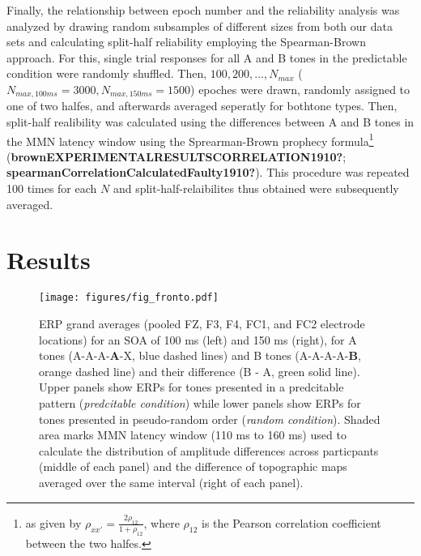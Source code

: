 \documentclass[stu,a4paper,12pt, nofontenc, babel, american]{apa7}
\begin{document}
Finally, the relationship between epoch number and the reliability
analysis was analyzed by drawing random subsamples of different sizes
from both our data sets and calculating split-half reliability employing
the Spearman-Brown approach. For this, single trial responses for all A
and B tones in the predictable condition were randomly shuffled. Then,
\(100, 200, ..., N_{max}\)
(\(N_{max, 100ms} = 3000, N_{max, 150ms}=1500\)) epoches were drawn,
randomly assigned to one of two halfes, and afterwards averaged
seperatly for bothtone types. Then, split-half realibility was
calculated using the differences between A and B tones in the MMN
latency window using the Sprearman-Brown prophecy formula\footnote{as
  given by \({\rho}_{xx'} = \frac{2{\rho}_{12}}{1+{\rho}_{12}}\), where
  \({\rho_{12}}\) is the Pearson correlation coefficient between the two
  halfes.} (\textbf{brownEXPERIMENTALRESULTSCORRELATION1910?};
\textbf{spearmanCorrelationCalculatedFaulty1910?}). This procedure was
repeated 100 times for each \(N\) and split-half-relaibilites thus
obtained were subsequently averaged.

\newpage

\hypertarget{results}{%
\section{Results}\label{results}}

\begin{figure}
\hypertarget{fig:fronto}{%
\centering
\texttt{[image: figures/fig\_fronto.pdf]}
\caption{ERP grand averages (pooled FZ, F3, F4, FC1, and FC2 electrode
locations) for an SOA of 100 ms (left) and 150 ms (right), for A tones
(A-A-A-\textbf{A}-X, blue dashed lines) and B tones (A-A-A-A-\textbf{B},
orange dashed line) and their difference (B - A, green solid line).
Upper panels show ERPs for tones presented in a predcitable pattern
(\emph{predcitable condition}) while lower panels show ERPs for tones
presented in pseudo-random order (\emph{random condition}). Shaded area
marks MMN latency window (110 ms to 160 ms) used to calculate the
distribution of amplitude differences across particpants (middle of each
panel) and the difference of topographic maps averaged over the same
interval (right of each panel).}\label{fig:fronto}
}
\end{figure}
\end{document}
